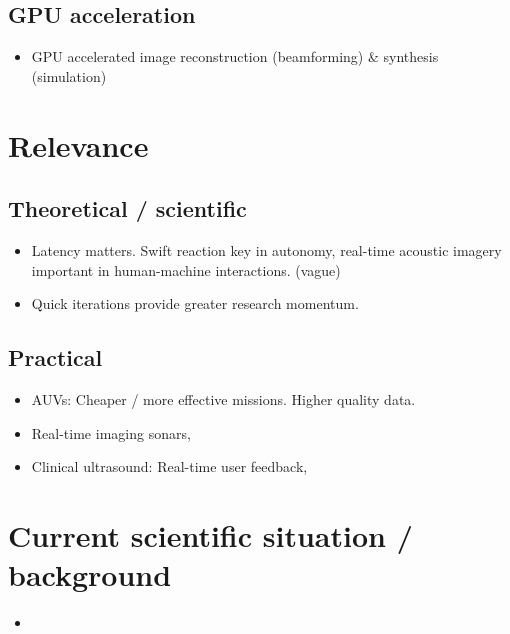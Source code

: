 \subsection{GPU acceleration }
\begin{itemize}
\item GPU accelerated image reconstruction (beamforming) \& synthesis (simulation)
\end{itemize}

\section{Relevance}
\subsection{Theoretical / scientific}
\begin{itemize}
\item Latency matters. Swift reaction key in autonomy, real-time acoustic imagery important in human-machine interactions. (vague)
\item Quick iterations provide greater research momentum.
\end{itemize}

\subsection{Practical}
\begin{itemize}
\item AUVs: Cheaper / more effective missions. Higher quality data. 
\item Real-time imaging sonars,
\item Clinical ultrasound: Real-time user feedback,
\end{itemize}




\section{Current scientific situation / background}
\begin{itemize}
  \item 
\end{itemize}
% 
